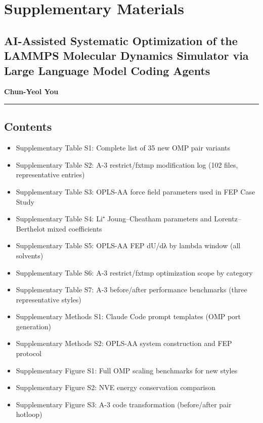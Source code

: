 \documentclass[
  11pt,
]{article}
\author{}
\date{}
\providecommand{\tightlist}{%
  \setlength{\itemsep}{0pt}\setlength{\parskip}{0pt}}
\providecommand{\tightlist}{%
  \setlength{\itemsep}{0pt}\setlength{\parskip}{0pt}}
\begin{document}
\section{Supplementary Materials}\label{supplementary-materials}

\subsection{AI-Assisted Systematic Optimization of the LAMMPS Molecular
Dynamics Simulator via Large Language Model Coding
Agents}\label{ai-assisted-systematic-optimization-of-the-lammps-molecular-dynamics-simulator-via-large-language-model-coding-agents}

\textbf{Chun-Yeol You}

\begin{center}\rule{0.5\linewidth}{0.5pt}\end{center}

\subsection{Contents}\label{contents}

\begin{itemize}
\tightlist
\item
  Supplementary Table S1: Complete list of 35 new OMP pair variants
\item
  Supplementary Table S2: A-3 restrict/fxtmp modification log (102
  files, representative entries)
\item
  Supplementary Table S3: OPLS-AA force field parameters used in FEP
  Case Study
\item
  Supplementary Table S4: Li⁺ Joung--Cheatham parameters and
  Lorentz--Berthelot mixed coefficients
\item
  Supplementary Table S5: OPLS-AA FEP dU/dλ by lambda window (all
  solvents)
\item
  Supplementary Table S6: A-3 restrict/fxtmp optimization scope by
  category
\item
  Supplementary Table S7: A-3 before/after performance benchmarks (three
  representative styles)
\item
  Supplementary Methods S1: Claude Code prompt templates (OMP port
  generation)
\item
  Supplementary Methods S2: OPLS-AA system construction and FEP protocol
\item
  Supplementary Figure S1: Full OMP scaling benchmarks for new styles
\item
  Supplementary Figure S2: NVE energy conservation comparison
\item
  Supplementary Figure S3: A-3 code transformation (before/after pair
  hotloop)
\end{itemize}
\end{document}
